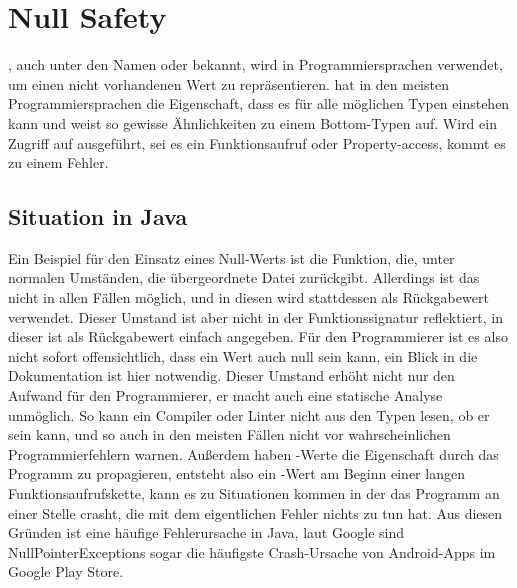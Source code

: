 
\section{Null Safety}\label{sec:null-safety}

\renewcommand{\kapitelautor}{Autor: Marvin Kurka}

, auch unter den Namen  oder  bekannt, wird in Programmiersprachen
verwendet, um einen nicht vorhandenen Wert zu repräsentieren.
 hat in den meisten Programmiersprachen die Eigenschaft, dass es für alle möglichen Typen einstehen
kann und weist so gewisse Ähnlichkeiten zu einem Bottom-Typen auf. %
Wird ein Zugriff auf  ausgeführt, sei es ein Funktionsaufruf oder Property-access, kommt es zu
einem Fehler.

\subsection{Situation in Java}
Ein Beispiel für den Einsatz eines Null-Werts ist die  Funktion, die, unter normalen
Umständen, die übergeordnete Datei zurückgibt.
Allerdings ist das nicht in allen Fällen möglich, und in diesen wird  stattdessen als Rückgabewert
verwendet.\cite{jdocFile}
Dieser Umstand ist aber nicht in der Funktionssignatur reflektiert, in dieser ist als Rückgabewert einfach
 angegeben.
Für den Programmierer ist es also nicht sofort offensichtlich, dass ein Wert auch null sein kann, ein Blick in die
Dokumentation ist hier notwendig.
Dieser Umstand erhöht nicht nur den Aufwand für den Programmierer, er macht auch eine statische Analyse unmöglich.
So kann ein Compiler oder Linter nicht aus den Typen lesen, ob er  sein kann, und so auch in den
meisten Fällen nicht vor wahrscheinlichen Programmierfehlern warnen.
Außerdem haben -Werte die Eigenschaft durch das Programm zu propagieren, entsteht also ein
-Wert am Beginn einer langen Funktionsaufrufskette, kann es zu Situationen kommen in der das Programm
an einer Stelle crasht, die mit dem eigentlichen Fehler nichts zu tun hat.
Aus diesen Gründen ist  eine häufige Fehlerursache in Java, laut Google sind
NullPointerExceptions sogar die häufigste Crash-Ursache von Android-Apps im Google Play Store.\cite{androidDevNPE}

